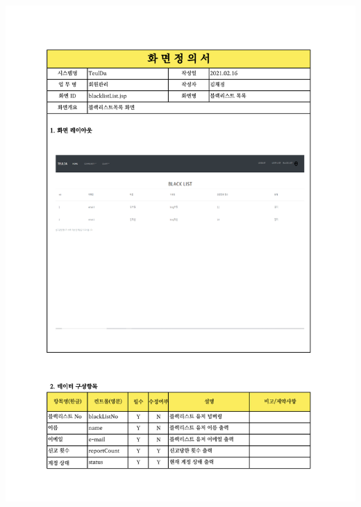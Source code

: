 {{{{{{{{{{{{{\includegraphics[width=20cm]{./Figure/Design/Display/user/user_13.pdf} \\
}}}}}}}}}}}}}
